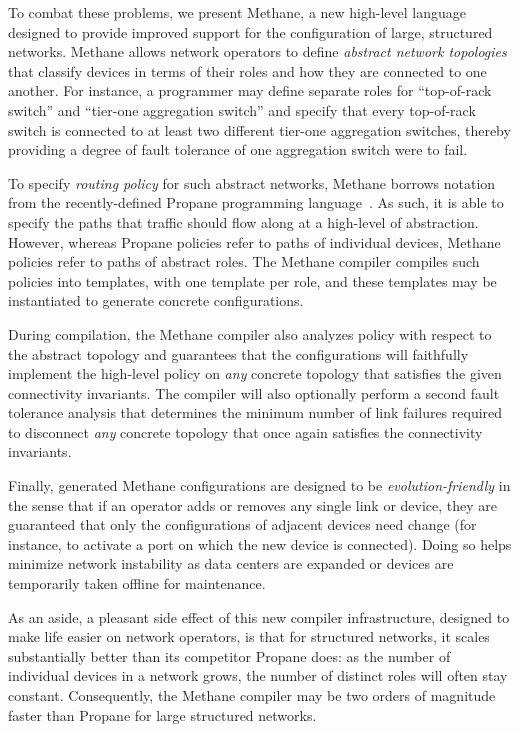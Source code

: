 \documentclass{sig-alternate-10pt}
\newcommand{\sysname}{{\small \sf Methane}\xspace}
\newcommand{\propane}{{\small \sf Propane}\xspace}
\begin{document}
To combat these problems, we present \sysname, a 
new high-level language designed to 
provide improved support for the configuration of large, structured networks.
\sysname allows network operators to define \emph{abstract network topologies} 
that
classify devices in terms of their roles and how they are connected
to one another.  For instance, a programmer may
define separate roles for ``top-of-rack switch'' and 
``tier-one aggregation switch'' and specify that every top-of-rack switch
is connected to at least two different tier-one aggregation switches,
thereby providing a degree of fault tolerance of one aggregation switch
were to fail.

To specify \emph{routing policy} for such abstract networks,
\sysname borrows notation from the recently-defined \propane
programming language~\cite{propane}.  As such, it is able to
specify the paths that traffic should flow along at a high-level of
abstraction.  However, whereas \propane policies
refer to paths of individual devices, \sysname policies 
refer to paths of abstract roles.  The \sysname compiler compiles such
policies into templates, with one template per role, and these templates
may be instantiated to generate concrete configurations. 

During compilation, the \sysname compiler also analyzes policy with respect to the
abstract topology and guarantees that the configurations will 
faithfully implement the high-level policy on \emph{any} concrete
topology that satisfies the given connectivity invariants.  The compiler
will also optionally perform a second fault tolerance analysis that 
determines the minimum number of link failures required to disconnect
\emph{any} concrete topology that once again satisfies the connectivity
invariants.  

Finally, generated \sysname configurations are designed to
be \emph{evolution-friendly} in the sense that if an operator adds or
removes any single link or device, they are guaranteed that only 
the configurations of adjacent devices need change (for instance, to
activate a port on which the new device is connected).  Doing so
helps minimize network instability as data centers are expanded or devices are
temporarily taken offline for maintenance.

As an aside, a pleasant side effect of this new compiler
infrastructure, designed to make life easier on network operators, is
that for structured networks, it scales substantially better than its
competitor \propane does: as the number of individual devices in a
network grows, the number of distinct roles will often stay constant.
Consequently, the \sysname compiler may be two orders of magnitude
faster than \propane for large structured networks.
\end{document}
